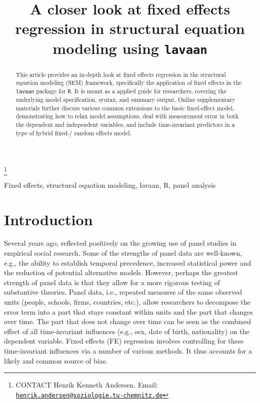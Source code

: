 \documentclass[]{interact}
\theoremstyle{plain}%
\theoremstyle{definition}
\theoremstyle{remark}
\begin{document}
\articletype{}

\title{A closer look at fixed effects regression in structural equation
modeling using \texttt{lavaan}}


\author{
}

\thanks{CONTACT Henrik Kenneth Andersen. Email: \href{mailto:henrik.andersen@soziologie.tu-chemnitz.de}{\nolinkurl{henrik.andersen@soziologie.tu-chemnitz.de}}}

\maketitle

\begin{abstract}
This article provides an in-depth look at fixed effects regression in
the structural equation modeling (SEM) framework, specifically the
application of fixed effects in the \texttt{lavaan} package for
\texttt{R}. It is meant as a applied guide for researchers, covering the
underlying model specification, syntax, and summary output. Online
supplementary materials further discuss various common extensions to the
basic fixed-effect model, demonstrating how to relax model assumptions,
deal with measurement error in both the dependent and independent
variables, and include time-invariant predictors in a type of hybrid
fixed-/ random effects model.
\end{abstract}

\begin{keywords}
Fixed effects, structural equation modeling, lavaan, R, panel analysis
\end{keywords}

\newpage

\setcounter{page}{1}

\doublespacing

\hypertarget{intro}{%
\section{Introduction}\label{intro}}

Several years ago, \citet{Curran2011} reflected positively on the
growing use of panel studies in empirical social research. Some of the
strengths of panel data are well-known, e.g., the ability to establish
temporal precedence, increased statistical power and the reduction of
potential alternative models. However, perhaps the greatest strength of
panel data is that they allow for a more rigorous testing of substantive
theories. Panel data, i.e., repeated measures of the same observed units
(people, schools, firms, countries, etc.), allow researchers to
decompose the error term into a part that stays constant within units
and the part that changes over time. The part that does not change over
time can be seen as the combined effect of all time-invariant influences
(e.g., sex, date of birth, nationality) on the dependent variable. Fixed
effects (FE) regression involves controlling for these time-invariant
influences via a number of various methods. It thus accounts for a
likely and common source of bias.
\end{document}

